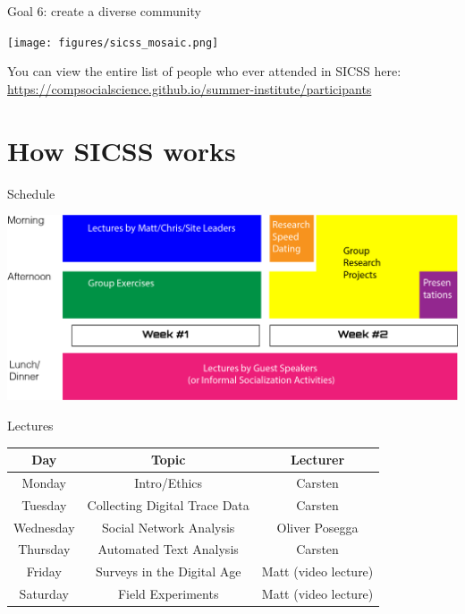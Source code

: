 \documentclass{beamer}
\def\vf{\vfill}
\begin{document}
\begin{frame}{Goal 6: create a diverse community}

\begin{center}
\texttt{[image: figures/sicss\_mosaic.png]}
\end{center}

\vf
You can view the entire list of people who ever attended in SICSS here: \\ \small{\url{https://compsocialscience.github.io/summer-institute/participants}}

\end{frame}

\section{How SICSS works}

\begin{frame}{Schedule}

\begin{center}
\includegraphics[width=1.0\textwidth]{figures/SICSSAnatomy.png}
\end{center}

\end{frame}


\begin{frame}{Lectures}

\begin{center}
\begin{tabular}{ c|c|c } 
\hline
\textbf{Day} & \textbf{Topic} & \textbf{Lecturer} \\
\hline
Monday & Intro/Ethics & Carsten \\ 
Tuesday & Collecting Digital Trace Data & Carsten \\ 
Wednesday & Social Network Analysis & Oliver Posegga\\ 
Thursday & Automated Text Analysis & Carsten \\ 
Friday & Surveys in the Digital Age & Matt (video lecture)\\ 
Saturday & Field Experiments & Matt (video lecture)\\ 

\hline
\end{tabular}
\end{center}

\end{frame}
\end{document}
